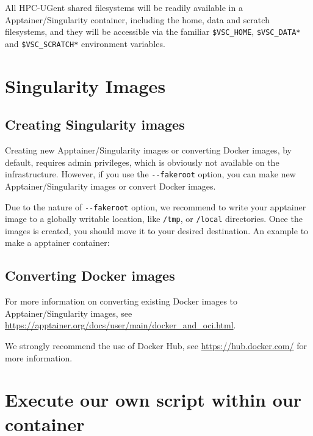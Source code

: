 All HPC-UGent shared filesystems will be readily available in a Apptainer/Singularity container,
including the home, data and scratch filesystems, and they will be accessible via the
familiar \lstinline|$VSC_HOME|, \lstinline|$VSC_DATA*| and \lstinline|$VSC_SCRATCH*| environment variables.

\section{Singularity Images}

\subsection{Creating Singularity images}

Creating new Apptainer/Singularity images or converting Docker images, by default, requires admin privileges,
which is obviously not available on the \hpcInfra infrastructure. However,
if you use the \lstinline|--fakeroot| option, you can make new Apptainer/Singularity images or convert 
Docker images. 

Due to the nature of \lstinline|--fakeroot| option, we recommend to write your apptainer 
image to a globally writable location, like \lstinline|/tmp|, or \lstinline|/local| directories. 
Once the images is created, you should move it to your desired destination.
An example to make a apptainer container:

\begin{prompt}
\end{prompt}

\subsection{Converting Docker images}

For more information on converting existing Docker images to Apptainer/Singularity images,
see \url{https://apptainer.org/docs/user/main/docker_and_oci.html}.

We strongly recommend the use of Docker Hub, see \url{https://hub.docker.com/} for more information.

\section{Execute our own script within our container}

